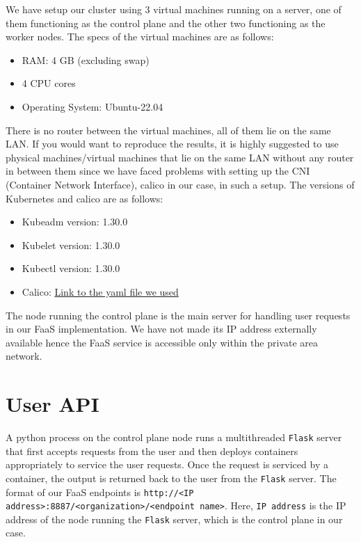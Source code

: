 \documentclass{article}
\begin{document}
We have setup our cluster using 3 virtual machines running on a server, one of them functioning as the control plane and the other two functioning as the worker nodes. The specs of the virtual machines are as follows:
\begin{itemize}
    \item RAM: 4 GB (excluding swap)
    \item 4 CPU cores
    \item Operating System: Ubuntu-22.04 
\end{itemize}
There is no router between the virtual machines, all of them lie on the same LAN. If you would want to reproduce the results, it is highly suggested to use physical machines/virtual machines that lie on the same LAN without any router in between them since we have faced problems with setting up the CNI (Container Network Interface), calico in our case, in such a setup. The versions of Kubernetes and calico are as follows:
\begin{itemize}
    \item Kubeadm version: 1.30.0
    \item Kubelet version: 1.30.0
    \item Kubectl version: 1.30.0
    \item Calico: \href{https://raw.githubusercontent.com/projectcalico/calico/v3.27.3/manifests/calico-typha.yaml}{Link to the yaml file we used}
\end{itemize}
The node running the control plane is the main server for handling user requests in our FaaS implementation. We have not made its IP  address externally available hence the FaaS service is accessible only within the private area network.

\section{User API}

A python process on the control plane node runs a multithreaded \texttt{Flask} server that first accepts requests from the user and then deploys containers appropriately to service the user requests. Once the request is serviced by a container, the output is returned back to the user from the \texttt{Flask} server. The format of our FaaS endpoints is \texttt{http://<IP address>:8887/<organization>/<endpoint name>}. Here, \texttt{IP address} is the IP address of the node running the \texttt{Flask} server, which is the control plane in our case.
\end{document}
